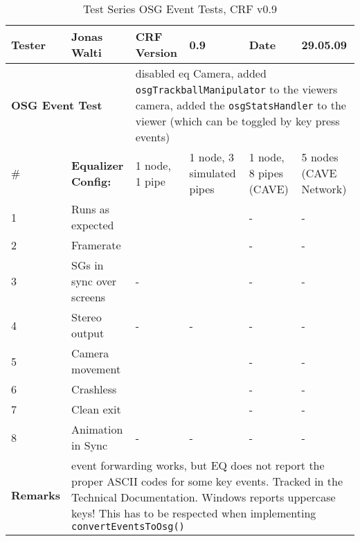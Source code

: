 \begin{table}[H]
	\centering
	\begin{tabular}{|b{}|b{}|m{}|m{}|m{}|m{}|}
		\hline
		\bfseries Tester & Jonas Walti & \bfseries CRF Version & 0.9 & \bfseries Date & 29.05.09 \\
		\hline
		\hline
		\multicolumn{2}{|l|}{\large{\bfseries OSG Event Test}} & \multicolumn{4}{p{0.6\textwidth}|}{disabled eq Camera, added \texttt{osgTrackballManipulator} to the viewers camera, added the \texttt{osgStatsHandler} to the viewer (which can be toggled by key press events)} \\
		\hline
		\hline
		\# & \bfseries Equalizer Config: & 1 node, 1 pipe & 1 node, 3 simulated pipes &  1 node, 8 pipes (CAVE) &  5 nodes (CAVE Network) \\
		\hline 1 & Runs as expected & \cross & \cross & \quad\quad- & - \\
		\hline 2 & Framerate & \quad\quad 60 & \quad\quad 20 & \quad\quad- & - \\
		\hline 3 & SGs in sync over screens & \quad\quad- & \tick & \quad\quad- & - \\
		\hline 4 & Stereo output & \quad\quad- & \quad\quad- & \quad\quad- & \quad\quad- \\
		\hline 5 & Camera movement & \tick & \tick & \quad\quad- & \quad\quad-\\
		\hline 6 & Crashless & \tick & \tick & \quad\quad- & \quad\quad-\\
		\hline 7 & Clean exit & \tick & \tick & \quad\quad- & \quad\quad- \\
		\hline 8 & Animation in Sync & \quad\quad- & - & \quad\quad- & \quad\quad- \\
		\hline
		\hline \bfseries Remarks & \multicolumn{5}{p{0.85\textwidth}|}{event forwarding works, but EQ does not report the proper ASCII codes for some key events. Tracked in the Technical Documentation. Windows reports uppercase keys! This has to be respected when implementing \texttt{convertEventsToOsg()}}\\
		\hline
	\end{tabular}
	\caption{Test Series OSG Event Tests, CRF v0.9}
\end{table}

